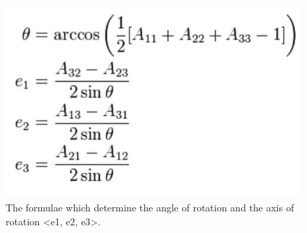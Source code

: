 \begin{figure}[H]
\centering
\includegraphics[scale=0.45]{Figures/4_angleAxisMatrix.JPG}
\caption[Rotational Angle and Axis Formulae]{The formulae which determine the angle of rotation and the axis of rotation <e1, e2, e3>.}
\label{fig:angleAxisformulae}
\end{figure}




